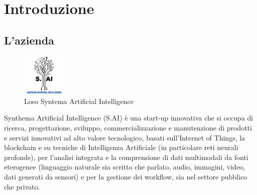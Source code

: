 

\chapter{Introduzione}
\label{cap:introduzione}





\section{L'azienda}
\begin{figure}[H]
  \centering
  \includegraphics[width=2cm]{immagini/logo-SAI.jpg}
  \caption{Loso Syntema Artificial Intelligence}
\end{figure}
Synthema Artificial Intelligence (S.AI) è una start-up innovativa che si occupa di ricerca, progettazione, sviluppo, commercializzazione e manutenzione di
prodotti e servizi innovativi ad alto valore tecnologico, basati sull'Internet of Things, la blockchain e su tecniche di Intelligenza Artificiale
(in particolare reti neurali profonde), per l'analisi integrata e la comprensione di dati multimodali da fonti eterogenee (linguaggio naturale sia scritto che
parlato, audio, immagini, video, dati generati da sensori) e per la gestione dei workflow, sia nel settore pubblico che privato.

